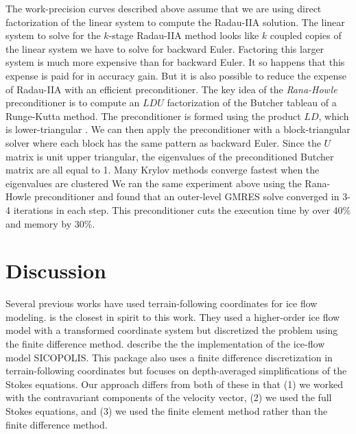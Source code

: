 \documentclass[gmd, manuscript]{copernicus}
\begin{document}
The work-precision curves described above assume that we are using direct factorization of the linear system to compute the Radau-IIA solution.
The linear system to solve for the $k$-stage Radau-IIA method looks like $k$ coupled copies of the linear system we have to solve for backward Euler.
Factoring this larger system is much more expensive than for backward Euler.
It so happens that this expense is paid for in accuracy gain.
But it is also possible to reduce the expense of Radau-IIA with an efficient preconditioner.
The key idea of the \emph{Rana-Howle} preconditioner is to compute an $LDU$ factorization of the Butcher tableau of a Runge-Kutta method.
The preconditioner is formed using the product $LD$, which is lower-triangular \citep{rana2021new}.
We can then apply the preconditioner with a block-triangular solver where each block has the same pattern as backward Euler.
Since the $U$ matrix is unit upper triangular, the eigenvalues of the preconditioned Butcher matrix are all equal to 1.
Many Krylov methods converge fastest when the eigenvalues are clustered \citep{saad2003iterative}
We ran the same experiment above using the Rana-Howle preconditioner and found that an outer-level GMRES solve converged in 3-4 iterations in each step.
This preconditioner cuts the execution time by over 40\% and memory by 30\%.


\section{Discussion}

Several previous works have used terrain-following coordinates for ice flow modeling.
\citet{kleiner2014numerical} is the closest in spirit to this work.
They used a higher-order ice flow model with a transformed coordinate system but discretized the problem using the finite difference method.
\citet{greve2009dynamics} describe the the implementation of the ice-flow model SICOPOLIS.
This package also uses a finite difference discretization in terrain-following coordinates but focuses on depth-averaged simplifications of the Stokes equations.
Our approach differs from both of these in that (1) we worked with the contravariant components of the velocity vector, (2) we used the full Stokes equations, and (3) we used the finite element method rather than the finite difference method.
\end{document}
